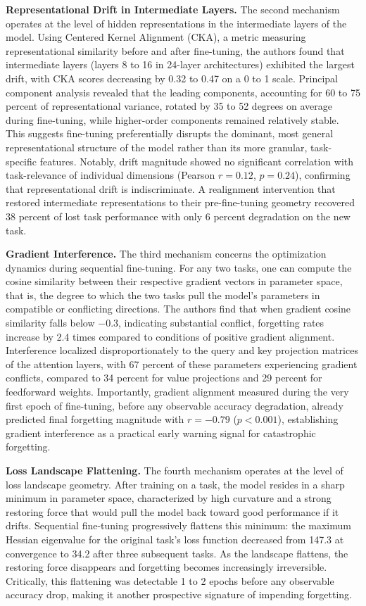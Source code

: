 \documentclass[a4paper,12pt]{article}
\begin{document}
\textbf{Representational Drift in Intermediate Layers.} The second mechanism
operates at the level of hidden representations in the intermediate layers of the
model. Using Centered Kernel Alignment (CKA), a metric measuring representational
similarity before and after fine-tuning, the authors found that intermediate layers
(layers 8 to 16 in 24-layer architectures) exhibited the largest drift, with CKA
scores decreasing by 0.32 to 0.47 on a 0 to 1 scale. Principal component analysis
revealed that the leading components, accounting for 60 to 75 percent of
representational variance, rotated by 35 to 52 degrees on average during fine-tuning,
while higher-order components remained relatively stable. This suggests fine-tuning
preferentially disrupts the dominant, most general representational structure of the
model rather than its more granular, task-specific features. Notably, drift magnitude
showed no significant correlation with task-relevance of individual dimensions
(Pearson $r = 0.12$, $p = 0.24$), confirming that representational drift is
indiscriminate. A realignment intervention that restored intermediate representations
to their pre-fine-tuning geometry recovered 38 percent of lost task performance with
only 6 percent degradation on the new task.

\textbf{Gradient Interference.} The third mechanism concerns the optimization
dynamics during sequential fine-tuning. For any two tasks, one can compute the
cosine similarity between their respective gradient vectors in parameter space, that
is, the degree to which the two tasks pull the model's parameters in compatible or
conflicting directions. The authors find that when gradient cosine similarity falls
below $-0.3$, indicating substantial conflict, forgetting rates increase by 2.4 times
compared to conditions of positive gradient alignment. Interference localized
disproportionately to the query and key projection matrices of the attention layers,
with 67 percent of these parameters experiencing gradient conflicts, compared to
34 percent for value projections and 29 percent for feedforward weights. Importantly,
gradient alignment measured during the very first epoch of fine-tuning, before any
observable accuracy degradation, already predicted final forgetting magnitude with
$r = -0.79$ ($p < 0.001$), establishing gradient interference as a practical early
warning signal for catastrophic forgetting.

\textbf{Loss Landscape Flattening.} The fourth mechanism operates at the level of
loss landscape geometry. After training on a task, the model resides in a sharp
minimum in parameter space, characterized by high curvature and a strong restoring
force that would pull the model back toward good performance if it drifts. Sequential
fine-tuning progressively flattens this minimum: the maximum Hessian eigenvalue for
the original task's loss function decreased from 147.3 at convergence to 34.2 after
three subsequent tasks. As the landscape flattens, the restoring force disappears
and forgetting becomes increasingly irreversible. Critically, this flattening was
detectable 1 to 2 epochs before any observable accuracy drop, making it another
prospective signature of impending forgetting.
\end{document}
